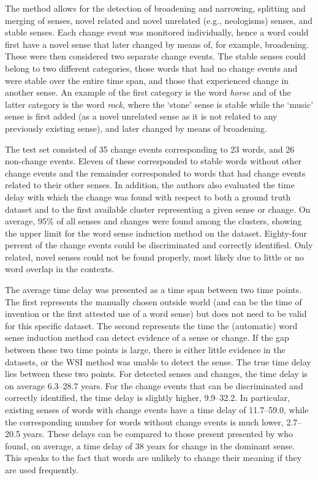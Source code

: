 \documentclass[output=paper]{langsci/langscibook}
\begin{document}
\begin{sloppypar}
The method allows for the detection of broadening and narrowing, splitting and merging of senses, novel related and novel unrelated (e.g.,  neologisms) senses, and stable senses. Each change event was monitored individually, hence a word could first have a novel sense that later changed by means of, for example, broadening. These were then considered two separate change events. The stable senses could belong to two different categories, those words that had no change events and were stable over the entire time span, and those that experienced change in another sense. An example of the first category is the word \textit{horse} and of the latter category is the word \textit{rock}, where the 
`stone' sense is stable while the `music' sense is first added (as a novel unrelated sense as it is not related to any previously existing sense), and later changed by means of broadening. 
\end{sloppypar}

The test set consisted of 35 change events corresponding to 23 words, and 26 non-change events. Eleven of these corresponded to stable words without other change events and the remainder corresponded to words that had change events related to their other senses. In addition, 
the authors also evaluated the time delay with which the change was found with respect to both a ground truth dataset and to the first available cluster representing a given sense or change. 
On average, 95\% of all senses and changes were found among the clusters, showing the upper limit for the word sense induction method on the dataset. 
Eighty-four percent of the change events could be discriminated and correctly identified. 
Only related, novel senses could not be found properly, most likely due to little or no word overlap in the contexts. 

The average time delay was presented as a time span between two time points. 
The first represents the manually chosen outside world (and can be the time of invention or the first attested use of a word sense) but does not need to be valid for this specific dataset. The second represents the time the (automatic) word sense induction method can detect evidence of a sense or change. If the gap between these two time points is large, there is either little evidence in the datasets, or the WSI method was unable to detect the sense.
The true time delay lies between these two points. 
For detected senses and changes, the time delay is on average 6.3--28.7 years. For the change events that can be discriminated and correctly identified, the time delay is slightly higher, 9.9--32.2. In particular, existing senses of words with change events have a time delay of 11.7--59.0, while the corresponding number for words without change events is much lower, 2.7--20.5 years. These delays can be compared to those present presented by \citet{basilediachronic} who found, on average, a time delay of 38 years for change in the dominant sense. 
This speaks to the fact that words are unlikely to change their meaning if they are used frequently. 
\end{document}
